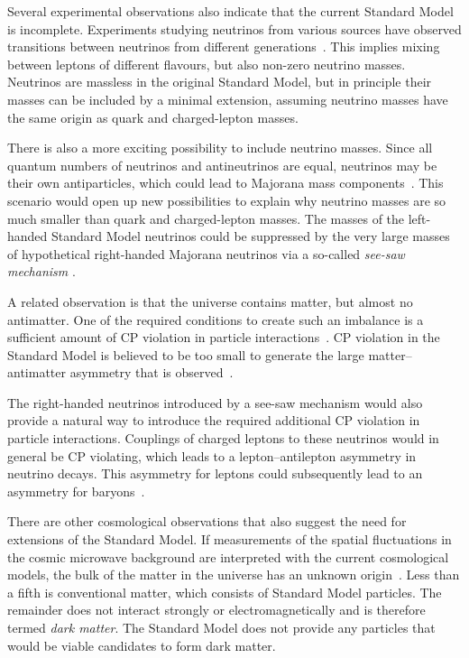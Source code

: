 Several experimental observations also indicate that the current Standard Model is incomplete. Experiments studying neutrinos from various
sources have observed transitions between neutrinos from different
generations~\cite{Fukuda:1998mi,*Ahmad:2002jz,*Eguchi:2002dm,*An:2012eh}. This implies mixing between leptons of different flavours, but
also non-zero neutrino masses. Neutrinos are massless in the original Standard Model, but in principle their masses can be included by a
minimal extension, assuming neutrino masses have the same origin as quark and charged-lepton masses.

There is also a more exciting possibility to include neutrino masses. Since all quantum numbers of neutrinos and antineutrinos are equal,
neutrinos may be their own antiparticles, which could lead to Majorana mass components~\cite{Majorana:1937vz}. This scenario would open up
new possibilities to explain why neutrino masses are so much smaller than quark and charged-lepton masses. The masses of the left-handed
Standard Model neutrinos could be suppressed by the very large masses of hypothetical right-handed Majorana neutrinos via a so-called
\emph{see-saw mechanism} \cite{Minkowski:1977sc}.

A related observation is that the universe contains matter, but almost no antimatter. One of the required conditions to create such an
imbalance is a sufficient amount of CP violation in particle interactions~\cite{Sakharov:1967dj}. CP violation in the Standard Model is
believed to be too small to generate the large matter--antimatter asymmetry that is
observed~\cite{Gavela:1993ts,*Huet:1994jb,*Gavela:1994dt}.

The right-handed neutrinos introduced by a see-saw mechanism would also provide a natural way to introduce the required additional CP
violation in particle interactions. Couplings of charged leptons to these neutrinos would in general be CP violating, which leads to a
lepton--antilepton asymmetry in neutrino decays. This asymmetry for leptons could subsequently lead to an asymmetry for
baryons~\cite{Kuzmin:1985mm,*Fukugita:1986hr}.

There are other cosmological observations that also suggest the need for extensions of the Standard Model. If measurements of the spatial
fluctuations in the cosmic microwave background are interpreted with the current cosmological models, the bulk of the matter in the
universe has an unknown origin~\cite{Hinshaw:2012aka}. Less than a fifth is conventional matter, which consists of Standard Model
particles. The remainder does not interact strongly or electromagnetically and is therefore termed \emph{dark matter}. The Standard Model
does not provide any particles that would be viable candidates to form dark matter.

